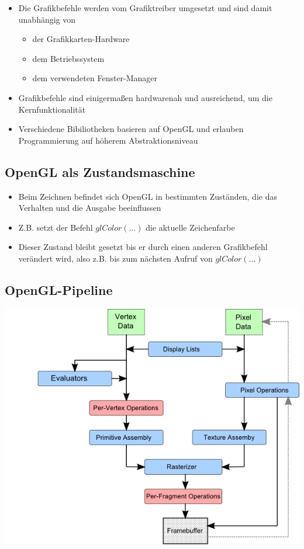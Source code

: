 \documentclass{scrartcl}
\begin{document}
\begin{itemize}
	\item Die Grafikbefehle werden vom Grafiktreiber umgesetzt und sind damit unabhängig von
	\begin{itemize}
		\item der Grafikkarten-Hardware
		\item dem Betriebssystem
		\item dem verwendeten Fenster-Manager
	\end{itemize}
	\item Grafikbefehle sind einigermaßen hardwarenah und ausreichend, um die Kernfunktionalität
	\item Verschiedene Bibiliotheken basieren auf OpenGL und erlauben Programmierung auf höherem Abstraktionsniveau
\end{itemize}

\subsection{OpenGL als Zustandsmaschine}

\begin{itemize}
	\item Beim Zeichnen befindet sich OpenGL in bestimmten Zuständen, die das Verhalten und die Ausgabe beeinflussen
	\item Z.B. setzt der Befehl $glColor(\ldots)$ die aktuelle Zeichenfarbe
	\item Dieser Zustand bleibt gesetzt bis er durch einen anderen Grafikbefehl verändert wird, also z.B. bis zum nächsten Aufruf von $glColor(\ldots)$
\end{itemize}

\subsection{OpenGL-Pipeline}

\includegraphics[scale=1]{figures/openglpipeline_animate0.png}
\end{document}
